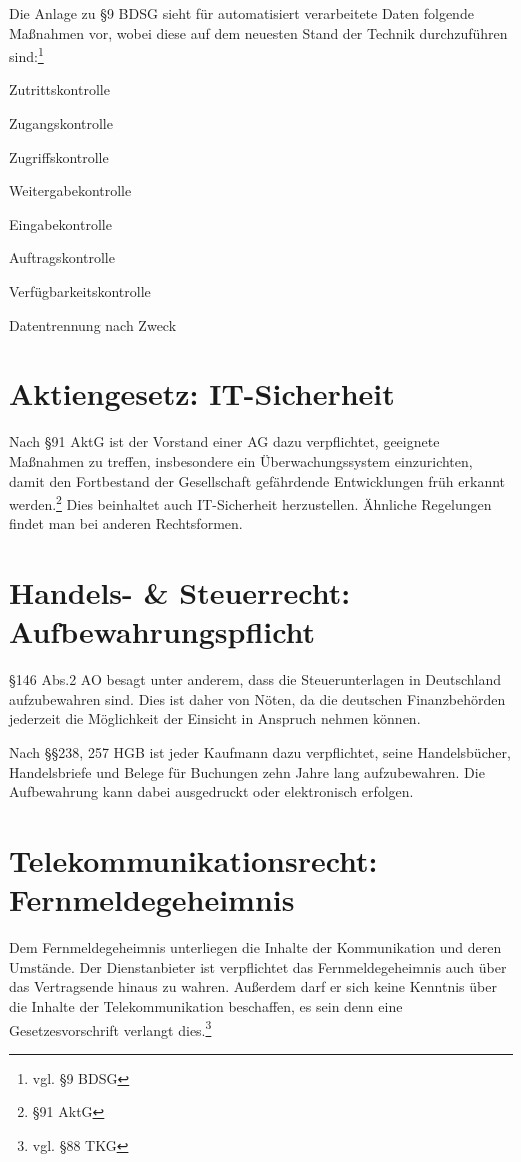 Die Anlage zu §9 BDSG sieht f\"ur automatisiert verarbeitete Daten folgende Ma{\ss}nahmen vor, wobei diese auf dem neuesten Stand der Technik durchzuf\"uhren sind:\footnote{vgl. §9 BDSG}
\begin{seList}

\item Zutrittskontrolle
\item Zugangskontrolle
\item Zugriffskontrolle
\item Weitergabekontrolle
\item Eingabekontrolle
\item Auftragskontrolle
\item Verf\"ugbarkeitskontrolle
\item Datentrennung nach Zweck
\end{seList} 
 \label{technische_u_organisatorische_massnahmen}
\section{Aktiengesetz: IT-Sicherheit}
Nach §91 AktG ist der Vorstand einer AG dazu verpflichtet, {\glqq}geeignete Ma{\ss}nahmen zu treffen, insbesondere ein \"Uberwachungssystem einzurichten, damit den Fortbestand der Gesellschaft gef\"ahrdende Entwicklungen fr\"uh erkannt werden.{\grqq}\footnote{§91 AktG} Dies beinhaltet auch IT-Sicherheit herzustellen. \"Ahnliche Regelungen findet man bei anderen Rechtsformen.

 \label{aktiengesetz_it_sicherheit}
\section{Handels- \& Steuerrecht: Aufbewahrungspflicht}
§146 Abs.2 AO besagt unter anderem, dass die Steuerunterlagen in Deutschland aufzubewahren sind. Dies ist daher von N\"oten, da die deutschen Finanzbeh\"orden jederzeit die M\"oglichkeit der Einsicht in Anspruch nehmen k\"onnen. \newline

Nach §§238, 257 HGB ist jeder Kaufmann dazu verpflichtet, seine Handelsb\"ucher, Handelsbriefe und Belege f\"ur Buchungen zehn Jahre lang aufzubewahren. Die Aufbewahrung kann dabei ausgedruckt oder elektronisch erfolgen.
 \label{handels_u_steuerrecht_aufbewahrungspflicht}
\section{Telekommunikationsrecht: Fernmeldegeheimnis}
Dem Fernmeldegeheimnis unterliegen die Inhalte der Kommunikation und deren Umst\"ande. Der Dienstanbieter ist verpflichtet das Fernmeldegeheimnis auch \"uber das Vertragsende hinaus zu wahren. Au{\ss}erdem darf er sich keine Kenntnis \"uber die Inhalte der Telekommunikation beschaffen, es sein denn eine Gesetzesvorschrift verlangt dies.\footnote{vgl. §88 TKG}
 \label{telekommunikationsrecht_fernmeldegeheimnis}

